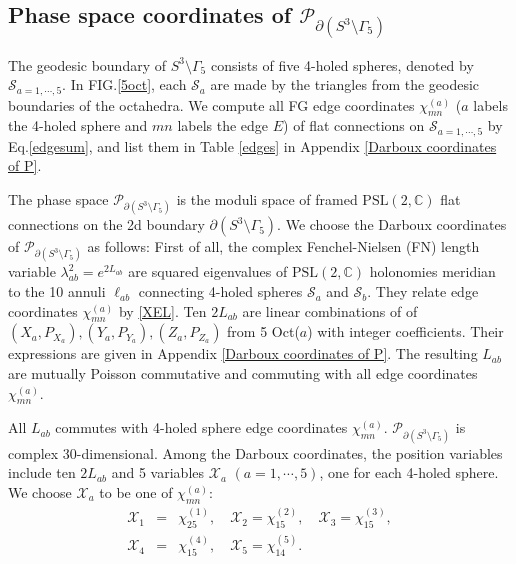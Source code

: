 \documentclass[aps,prd,notitlepage,nofootinbib,superscriptaddress,groupedaddress,twocolumn]{revtex4-1}
\newcommand{\PSlc}{\mathrm{PSL}(2,\mathbb{C})}
\def\be{\begin{eqnarray}}
\def\ee{\end{eqnarray}}
\newcommand{\calp}{\mathcal P}
\newcommand{\cs}{\mathcal S}
\newcommand{\cx}{\mathcal X}
\newcommand{\G}{\Gamma}
\renewcommand{\l}{\lambda}
\begin{document}
\subsection{Phase space coordinates of $\calp_{\partial (S^3\setminus\G_5)}$}\label{Phase space coordinates of}

The geodesic boundary of $S^3\setminus\G_5$ consists of five 4-holed spheres, denoted by $\cs_{a=1,\cdots,5}$. In FIG.\ref{5oct}, each $\cs_a$ are made by the triangles from the geodesic boundaries of the octahedra. We compute all FG edge coordinates $\chi^{(a)}_{mn}$ ($a$ labels the 4-holed sphere and $mn$ labels the edge $E$) of flat connections on $\cs_{a=1,\cdots,5}$ by Eq.\eqref{edgesum}, and list them in Table \ref{edges} in Appendix \ref{Darboux coordinates of P}.



The phase space $\calp_{\partial(S^3\setminus\G_5)}$ is the moduli space of framed $\PSlc$ flat connections on the 2d boundary $\partial(S^3\setminus\G_5)$. We choose the Darboux coordinates of $\calp_{\partial(S^3\setminus\G_5)}$ as follows: First of all, the complex Fenchel-Nielsen (FN) length variable $\l_{ab}^2=e^{2L_{ab}}$ are squared eigenvalues of $\PSlc$ holonomies meridian to the 10 annuli $\ell_{ab}$ connecting 4-holed spheres $\cs_a$ and $\cs_b$. They relate edge coordinates $\chi^{(a)}_{mn}$ by \eqref{XEL}. %
Ten $2L_{ab}$ are linear combinations of of $(X_a,P_{X_a}),(Y_a,P_{Y_a}),(Z_a,P_{Z_a})$ from 5 Oct($a$) with integer coefficients. Their expressions are given in Appendix \ref{Darboux coordinates of P}. The resulting $L_{ab}$ are mutually Poisson commutative and commuting with all edge coordinates $\chi^{(a)}_{mn}$. %

All $L_{ab}$ commutes with 4-holed sphere edge coordinates $\chi^{(a)}_{mn}$. $\calp_{\partial(S^3\setminus\G_5)}$ is complex 30-dimensional. Among the Darboux coordinates, the position variables include ten $2L_{ab}$ and 5 variables $\cx_a$ $(a=1,\cdots,5)$, one for each 4-holed sphere. We choose $\cx_a$ to be one of $\chi^{(a)}_{mn}$:
\be
\cx_1&=&\chi^{(1)}_{25},\quad
\cx_2=\chi^{(2)}_{15},\quad
\cx_3=\chi^{(3)}_{15},\nonumber\\
\cx_4&=&\chi^{(4)}_{15},\quad
\cx_5=\chi^{(5)}_{14}.
\ee
\end{document}
